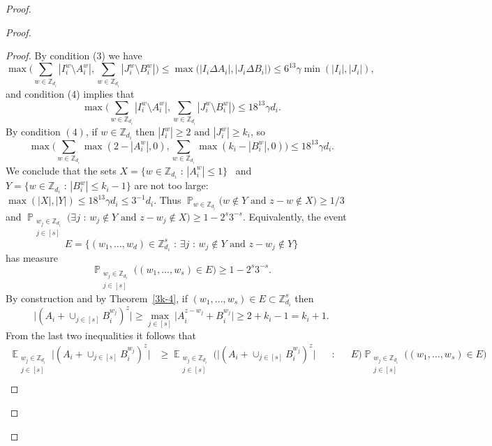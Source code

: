 \documentclass[12pt,reqno]{amsart}
\DeclareMathOperator*{\E}{\mathbb{E}}
\DeclareMathOperator*{\Prob}{\mathbb{P}}
\theoremstyle{definition}
\renewcommand\leq{\leqslant}
\renewcommand\geq{\geqslant}
\begin{document}
\begin{proof}
\begin{proof}
\begin{proof}
By condition (3) we have
\begin{equation*}\label{eq30.8}
\max\bigg(\sum_{w\in \mathbb{Z}_{d_i}} |I_i^w \setminus A_i^w|,  \sum_{w\in \mathbb{Z}_{d_i}} |J_i^w \setminus B_i^w| \bigg) \leq \max \bigg(|I_i\Delta A_i| , |J_i\Delta B_i| \bigg) \leq 6^{13}\gamma \min(|I_i|,|J_i|),
\end{equation*}
and condition (4) implies that
\begin{equation*}\label{eq30.9}
\max\bigg(\sum_{w\in \mathbb{Z}_{d_i}} |I_i^w \setminus A_i^w|,  \sum_{w\in \mathbb{Z}_{d_i}} |J_i^w \setminus B_i^w| \bigg) \leq 18^{13}\gamma d_i.
\end{equation*}
By condition $(4)$, if $w\in \mathbb{Z}_{d_i}$ then
$|I_i^w| \geq 2 \text{ and } |J_i^w| \geq k_i$, so
\begin{equation*}\label{eq30.11}
\max\bigg(\sum_{w\in \mathbb{Z}_{d_i}} \max(2-|A_i^w|,0),  \sum_{w\in \mathbb{Z}_{d_i}} \max(k_i- |B_i^w|, 0) \bigg) \leq 18^{13}\gamma d_i.
\end{equation*}
We conclude that the sets
$X=\{w\in \mathbb{Z}_{d_i} \text{ : } |A_i^{w}| \leq 1\}$ \  and  \  $Y=\{w\in \mathbb{Z}_{d_i} \text{ : } |B_i^{w}| \leq k_i-1\}$
are not too large: $\max(|X|,|Y|) \leq 18^{13}\gamma d_i \leq 3^{-1}d_i$.
Thus
$\Prob_{w\in \mathbb{Z}_{d_i}}\bigg( w\not \in Y \text{ and } z-w \not \in X \bigg) \geq 1/3$
and
$\Prob_{\substack{w_j\in \mathbb{Z}_{d_i} \\ j\in [s]}}\bigg( \exists j \text{ : } w_j\not \in Y \text{ and } z-w_j \not \in X \bigg) \geq 1-2^s3^{-s}$.
Equivalently, the event
\[
E=\bigg\{(w_1,\hdots,w_d) \in \mathbb{Z}_{d_i}^s \text{ : } \exists j \text{ : } w_j\not \in Y \text{ and } z-w_j \not \in Y \bigg\}
\]
has measure
\[
\Prob_{\substack{w_j\in \mathbb{Z}_{d_i} \\ j\in [s]}}\bigg((w_1, \hdots, w_s)\in E\bigg)\geq 1-2^s3^{-s}.
\]
By construction and by Theorem~\ref{3k-4}, if $(w_1,\hdots, w_s) \in E \subset \mathbb{Z}_{d_i}^s$
then
\begin{equation*}\label{eq30.19}
\bigg| (A_i+\cup_{j\in [s]} B_i^{w_j})^z\bigg| \geq \max_{j\in [s]} \bigg|A_i^{z-w_j}+B_i^{w_j} \bigg| \geq 2+k_i-1=k_i+1.
\end{equation*}
From the last two inequalities it follows that
\begin{equation*}\label{eq30.20}
\begin{split}
    \E_{\substack{w_j \in \mathbb{Z}_{d_i} \\ j\in[s] }} \bigg|(A_i+\cup_{j\in [s]} B_i^{w_j})^z \bigg| &\geq \E_{\substack{w_j \in \mathbb{Z}_{d_i} \\ j\in[s] }} \bigg( \bigg|(A_i+\cup_{j\in [s]} B_i^{w_j})^z \bigg| \text{  } \text{  } \text{ : } \text{  } \text{  } E\bigg) \Prob_{\substack{w_j\in \mathbb{Z}_{d_i} \\ j\in [s]}}\bigg((w_1, \hdots, w_s)\in E\bigg)\\

\end{split}
\end{equation*}
\end{proof}
\end{proof}
\end{proof}
\end{document}
